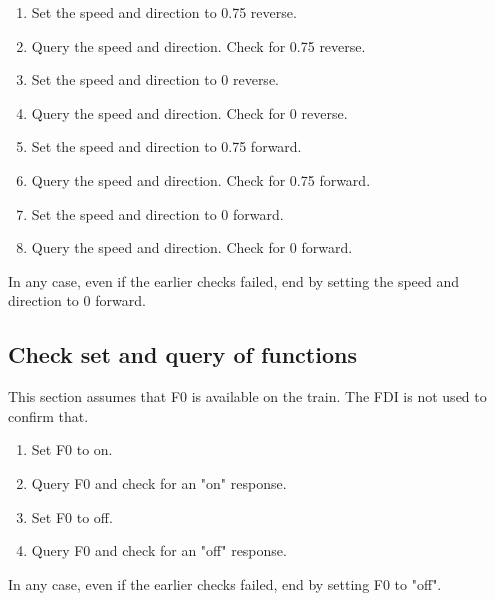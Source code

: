 \begin{enumerate}

    \item Set the speed and direction to 0.75 reverse.

    \item Query the speed and direction. Check for 0.75 reverse.

    \item Set the speed and direction to 0 reverse.

    \item Query the speed and direction. Check for 0 reverse.

    \item Set the speed and direction to 0.75 forward.

    \item Query the speed and direction. Check for 0.75 forward.

    \item Set the speed and direction to 0 forward.

    \item Query the speed and direction. Check for 0 forward.

\end{enumerate}

In any case, even if the earlier checks failed, end by setting the speed 
and direction to 0 forward.

\subsection{Check set and query of functions}

This section assumes that F0 is available on the train.
The FDI is not used to confirm that.

\begin{enumerate}

    \item Set F0 to on.

    \item Query F0 and check for an "on" response.

    \item Set F0 to off.

    \item Query F0 and check for an "off" response.

\end{enumerate}

In any case, even if the earlier checks failed, end by setting F0 to "off".


